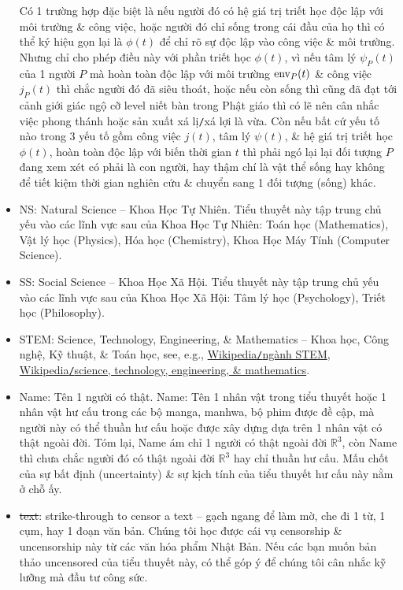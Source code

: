 \documentclass[12pt,oneside]{book}
\begin{document}
\begin{itemize}
	Có 1 trường hợp đặc biệt là nếu người đó có hệ giá trị triết học độc lập với môi trường \& công việc, hoặc người đó chỉ sống trong cái đầu của họ thì có thể ký hiệu gọn lại là $\phi(t)$ để chỉ rõ sự độc lập vào công việc \& môi trường. Nhưng chỉ cho phép điều này với phần triết học $\phi(t)$, vì nếu tâm lý $\psi_P(t)$ của 1 người $P$ mà hoàn toàn độc lập với môi trường ${\rm env}_P(t)$ \& công việc $j_P(t)$ thì chắc người đó đã siêu thoát, hoặc nếu còn sống thì cũng đã đạt tới cảnh giới giác ngộ cỡ level niết bàn trong Phật giáo thì có lẽ nên cân nhắc việc phong thánh hoặc sản xuất xá lị{\tt/}xá lợi là vừa. Còn nếu bất cứ yếu tố nào trong 3 yếu tố gồm công việc $j(t)$, tâm lý $\psi(t)$, \& hệ giá trị triết học $\phi(t)$, hoàn toàn độc lập với biến thời gian $t$ thì phải ngó lại lại đối tượng $P$ đang xem xét có phải là con người, hay thậm chí là vật thể sống hay không để tiết kiệm thời gian nghiên cứu \& chuyển sang 1 đối tượng (sống) khác.
	\item NS: Natural Science -- Khoa Học Tự Nhiên. Tiểu thuyết này tập trung chủ yếu vào các lĩnh vực sau của Khoa Học Tự Nhiên: Toán học (Mathematics), Vật lý học (Physics), Hóa học (Chemistry), Khoa Học Máy Tính (Computer Science).
	\item SS: Social Science -- Khoa Học Xã Hội. Tiểu thuyết này tập trung chủ yếu vào các lĩnh vực sau của Khoa Học Xã Hội: Tâm lý học (Psychology), Triết học (Philosophy).
	\item STEM: Science, Technology, Engineering, \& Mathematics -- Khoa học, Công nghệ, Kỹ thuật, \& Toán học, see, e.g., \href{https://vi.wikipedia.org/wiki/Ng%C3%A0nh_STEM}{Wikipedia{\tt/}ngành STEM}, \href{https://en.wikipedia.org/wiki/Science,_technology,_engineering,_and_mathematics}{Wikipedia{\tt/}science, technology, engineering, \& mathematics}.
	\item {\sc Name}: Tên 1 người có thật. {\sf Name}: Tên 1 nhân vật trong tiểu thuyết hoặc 1 nhân vật hư cấu trong các bộ manga, manhwa, bộ phim được đề cập, mà người này có thể thuần hư cấu hoặc được xây dựng dựa trên 1 nhân vật có  thật ngoài đời. Tóm lại, {\sc Name} ám chỉ 1 người có thật ngoài đời $\mathbb{R}^3$, còn {\sf Name} thì chưa chắc người đó có thật ngoài đời $\mathbb{R}^3$ hay chỉ thuần hư cấu. Mấu chốt của sự bất định (uncertainty) \& sự kịch tính của tiểu thuyết hư cấu này nằm ở chỗ ấy.
	\item \st{text}: strike-through to censor a text -- gạch ngang để làm mờ, che đi 1 từ, 1 cụm, hay 1 đoạn văn bản. Chúng tôi học được cái vụ censorship \& uncensorship này từ các văn hóa phẩm Nhật Bản. Nếu các bạn muốn bản thảo uncensored của tiểu thuyết này, có thể góp ý để chúng tôi cân nhắc kỹ lưỡng mà đầu tư công sức.
\end{itemize}
\end{document}
